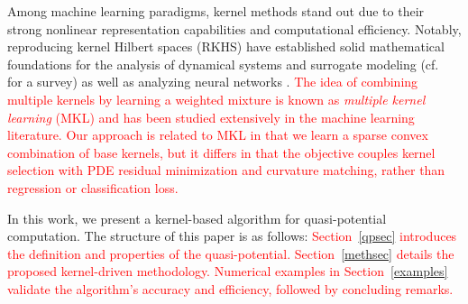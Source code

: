 \documentclass[11pt]{article}
\theoremstyle{plain}      %
\theoremstyle{definition} %
\begin{document}
Among machine learning paradigms, kernel methods stand out due to their strong nonlinear representation capabilities and computational efficiency. Notably, reproducing kernel Hilbert spaces (RKHS) \cite{CuckerandSmale} have established solid mathematical foundations for the analysis of  dynamical systems \cite{BH4, yk1, bhcm11,bhcm1, lyap_bh, bh_sparse_kfs, BHPhysicaD, hamzi2019kernel, bh2020b,SKO3,ALEXANDER2020132520,bh12,bh17,hb17,mmd_kernels_bh, hamzipaillet,jalalian_deds_2023,lee2024note, hamzi2025kernel_lions, bittracher2021dimensionality} and surrogate modeling (cf.\ \cite{santinhaasdonk19} for a survey) as well as analyzing neural networks \cite{smirnov2022mean}. \textcolor{red}{The idea of combining multiple kernels by learning a weighted mixture is known as \emph{multiple kernel learning} (MKL) \cite{lanckriet2004learning, bach2004multiple} and has been studied extensively in the machine learning literature. Our approach is related to MKL in that we learn a sparse convex combination of base kernels, but it differs in that the objective couples kernel selection with PDE residual minimization and curvature matching, rather than regression or classification loss.}

In this work, we present a kernel-based algorithm for quasi-potential computation. The structure of this paper is as follows: \textcolor{red}{Section~\ref{qpsec} introduces the definition and properties of the quasi-potential. Section~\ref{methsec} details the proposed kernel-driven methodology. Numerical examples in Section~\ref{examples} validate the algorithm's accuracy and efficiency, followed by concluding remarks.}





\end{document}
